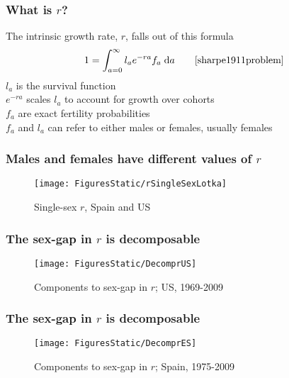 \documentclass{beamer}
\newcommand{\dd}{\; \mathrm{d}}
\begin{document}

\begin{frame}
  \frametitle{What is $r$?}
  The intrinsic growth rate, $r$, falls out of this formula
  \begin{equation}
  1 = \int _{a=0}^\infty l_ae^{-ra}f_a \dd a \notag \quad \quad
  \mathrm{\cite{sharpe1911problem}}
  \end{equation}
   $l_a$ is the survival function \\
   $e^{-ra}$ scales $l_a$ to account for growth over cohorts \\
   $f_a$ are exact fertility probabilities \\
   $f_a$ and $l_a$ can refer to either males or females, usually
  females
\end{frame}


\begin{frame}
  \frametitle{Males and females have different values of $r$}
  \vspace{-2em}
  \begin{figure}
  \centering
  \caption*{Single-sex $r$, Spain and US}
  \texttt{[image: FiguresStatic/rSingleSexLotka]}
\end{figure}
\end{frame}


\begin{frame}
  \frametitle{The sex-gap in $r$ is decomposable}
  \vspace{-2em}
\begin{figure}
\centering
\caption*{Components to sex-gap in $r$; US, 1969-2009}
\texttt{[image: FiguresStatic/DecomprUS]}
\end{figure}
\end{frame}


\begin{frame}
  \frametitle{The sex-gap in $r$ is decomposable}
  \vspace{-2em}
\begin{figure}
\centering
\caption*{Components to sex-gap in $r$; Spain, 1975-2009}
\texttt{[image: FiguresStatic/DecomprES]}
\end{figure}
\end{frame}
\end{document}
